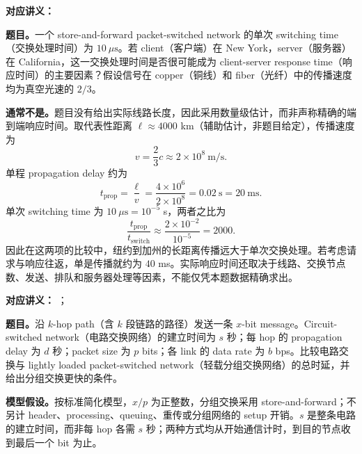 \begin{samepage}

\textbf{对应讲义：}

\textbf{题目。}一个 store-and-forward packet-switched network 的单次 switching time（交换处理时间）为 $10\ \mu\mathrm{s}$。若 client（客户端）在 New York，server（服务器）在 California，这一交换处理时间是否很可能成为 client-server response time（响应时间）的主要因素？假设信号在 copper（铜线）和 fiber（光纤）中的传播速度均为真空光速的 $2/3$。
\par
\end{samepage}

\begin{checkedsolution}
\textbf{通常不是。}题目没有给出实际线路长度，因此采用数量级估计，而非声称精确的端到端响应时间。取代表性距离 $\ell\approx4000$ km（辅助估计，非题目给定），传播速度为
\[
  v=\frac23c\approx2\times10^8\ \mathrm{m/s}.
\]
单程 propagation delay 约为
\[
  t_{\mathrm{prop}}=\frac{\ell}{v}
  =\frac{4\times10^6}{2\times10^8}
  =0.02\ \mathrm{s}=20\ \mathrm{ms}.
\]
单次 switching time 为 $10\ \mu\mathrm{s}=10^{-5}$ s，两者之比为
\[
  \frac{t_{\mathrm{prop}}}{t_{\mathrm{switch}}}
  \approx\frac{2\times10^{-2}}{10^{-5}}=2000.
\]
因此在这两项的比较中，纽约到加州的长距离传播远大于单次交换处理。若考虑请求与响应往返，单是传播就约为 $40$ ms。实际响应时间还取决于线路、交换节点数、发送、排队和服务器处理等因素，不能仅凭本题数据精确求出。
\end{checkedsolution}


\textbf{对应讲义：}
；\par
{}

\textbf{题目。}沿 $k$-hop path（含 $k$ 段链路的路径）发送一条 $x$-bit message。Circuit-switched network（电路交换网络）的建立时间为 $s$ 秒；每 hop 的 propagation delay 为 $d$ 秒；packet size 为 $p$ bits；各 link 的 data rate 为 $b$ bps。比较电路交换与 lightly loaded packet-switched network（轻载分组交换网络）的总时延，并给出分组交换更快的条件。

\textbf{模型假设。}按标准简化模型，$x/p$ 为正整数，分组交换采用 store-and-forward；不另计 header、processing、queuing、重传或分组网络的 setup 开销。$s$ 是整条电路的建立时间，而非每 hop 各需 $s$ 秒；两种方式均从开始通信计时，到目的节点收到最后一个 bit 为止。


